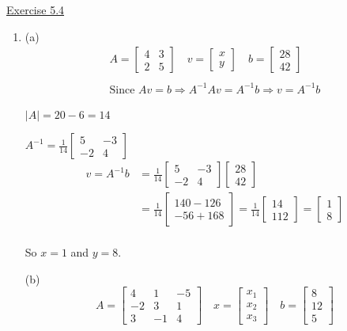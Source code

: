 \underline{Exercise 5.4} 

\begin{enumerate}

\item[6.] (a) \[
\begin{array}{l}
A=\left[\begin{array}{ll}
4 & 3 \\
2 & 5
\end{array}\right] \quad v=\left[\begin{array}{l}
x \\
y
\end{array}\right] \quad b=\left[\begin{array}{ll}
28 \\
42
\end{array}\right] \\~\\
\mbox{Since } A v=b \Rightarrow A^{-1} A v=A^{-1} b \Rightarrow v=A^{-1}b
\end{array}
\]

\(|A| =20-6=14 \)

\(A^{-1} =\frac{1}{14}\left[\begin{array}{cc}5 & -3 \\ -2 & 4\end{array}\right] \)
\[
\begin{aligned}v=A^{-1} b &=\frac{1}{14}\left[\begin{array}{cc}5 & -3 \\ -2 & 4\end{array}\right]\left[\begin{array}{l}28 \\ 42\end{array}\right] \\ &=\frac{1}{14}\left[\begin{array}{l}140-126 \\ -56+168\end{array}\right] = \frac{1}{14}\left[\begin{array}{l}14 \\ 112\end{array}\right] =\left[\begin{array}{l}1 \\ 8\end{array}\right] \end{aligned}
\]\\
So \(x=1\) and \(y=8\). \vspace{1em}

(b)
\[ A=\left[\begin{array}{ccc}4 & 1 & -5 \\ -2 & 3 & 1 \\ 3 & -1 & 4\end{array}\right] \quad x=\left[\begin{array}{l}x_{1} \\ x_{2} \\ x_{3}\end{array}\right] \quad b=\left[\begin{array}{c}8 \\ 12 \\ 5\end{array}\right] \] 


\end{enumerate}
